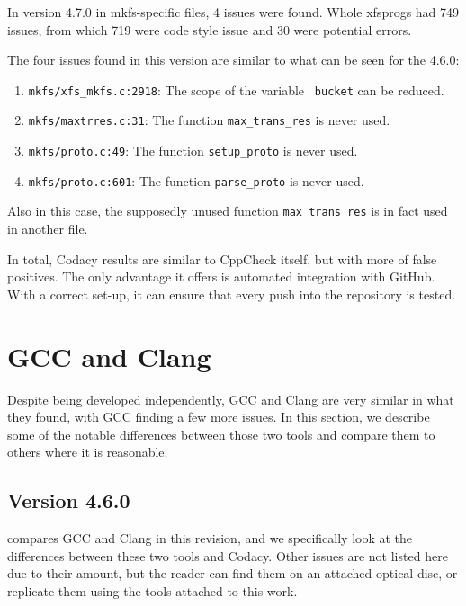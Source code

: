 In version 4.7.0 in mkfs-specific files, 4 issues were found. Whole
xfsprogs had 749 issues, from which 719 were code style issue and 30 were
potential errors.

The four issues found in this version are similar to what can be seen for the 4.6.0:
\begin{enumerate}
	\item {\tt mkfs/xfs\_mkfs.c:2918}: The scope of the variable {\tt
		bucket} can be reduced.
	\item {\tt mkfs/maxtrres.c:31}: The function {\tt max\_trans\_res}
		is never used.
	\item {\tt mkfs/proto.c:49}: The function {\tt setup\_proto} is
		never used.
	\item {\tt mkfs/proto.c:601}: The function {\tt parse\_proto} is
		never used.
\end{enumerate}

Also in this case, the supposedly unused function {\tt max\_trans\_res} is
in fact used in another file.

In total, Codacy results are similar to CppCheck itself, but with more of false
positives. The only advantage it offers is automated integration with GitHub.
With a correct set-up, it can ensure that every push into the repository is
tested.

\section{GCC and Clang}\label{chap:results:gcc}

Despite being developed independently, GCC and Clang are very similar in what
they found, with GCC finding a few more issues. In this section, we describe
some of the notable differences between those two tools and compare them to
others where it is reasonable.

\subsection{Version 4.6.0}\label{chap:results:gcc:4.6}

 compares GCC and Clang in this revision, and we
specifically look at the differences between these two tools and Codacy.
Other issues are not listed here due to their amount, but the reader can find
them on an attached optical disc, or replicate them using the tools attached to
this work.

